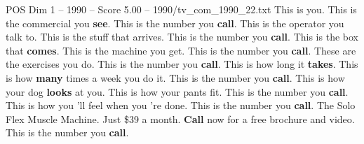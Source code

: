\begin{textsample}{POS Dim 1 – 1990 – Score 5.00 – 1990/tv\_com\_1990\_22.txt}  \label{ex:f1_pos_054}
This is you.
This is the commercial you \textbf{see}.
This is the number you \textbf{call}.
This is the operator you talk to.
This is the stuff that arrives.
This is the number you \textbf{call}.
This is the box that \textbf{comes}.
This is the machine you get.
This is the number you \textbf{call}.
These are the exercises you do.
This is the number you \textbf{call}.
This is how long it \textbf{takes}.
This is how \textbf{many} times a week you do it.
This is the number you \textbf{call}.
This is how your dog \textbf{looks} at you.
This is how your pants fit.
This is the number you \textbf{call}.
This is how you 'll feel when you 're done.
This is the number you \textbf{call}.
The Solo Flex Muscle Machine.
Just \$39 a month. \textbf{Call} now for a free brochure and video.
This is the number you \textbf{call}.

\end{textsample}
